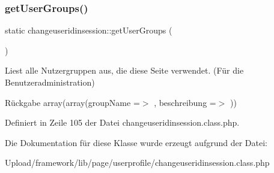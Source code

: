 \mbox{\label{classchangeuseridinsession_a9fe965ff939e53d54cb20df900b18b10}} 
\subsubsection{\texorpdfstring{get\+User\+Groups()}{getUserGroups()}}
{\footnotesize\ttfamily static changeuseridinsession\+::get\+User\+Groups (\begin{DoxyParamCaption}{ }\end{DoxyParamCaption})\hspace{0.3cm}{\ttfamily [static]}}

Liest alle Nutzergruppen aus, die diese Seite verwendet. (Für die Benutzeradministration) \begin{DoxyReturn}{Rückgabe}
array(array(\textquotesingle{}group\+Name\textquotesingle{} =$>$ \textquotesingle{}\textquotesingle{}, \textquotesingle{}beschreibung\textquotesingle{} =$>$ \textquotesingle{}\textquotesingle{})) 
\end{DoxyReturn}


Definiert in Zeile 105 der Datei changeuseridinsession.\+class.\+php.



Die Dokumentation für diese Klasse wurde erzeugt aufgrund der Datei\+:\begin{DoxyCompactItemize}
\item 
Upload/framework/lib/page/userprofile/changeuseridinsession.\+class.\+php\end{DoxyCompactItemize}
